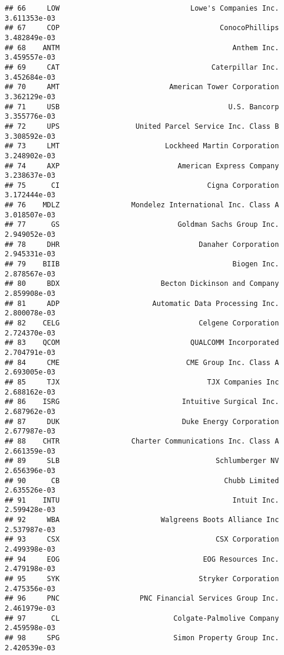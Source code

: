 \documentclass[
]{article}
\begin{document}
\begin{verbatim}
## 66     LOW                               Lowe's Companies Inc. 3.611353e-03
## 67     COP                                      ConocoPhillips 3.482849e-03
## 68    ANTM                                         Anthem Inc. 3.459557e-03
## 69     CAT                                    Caterpillar Inc. 3.452684e-03
## 70     AMT                          American Tower Corporation 3.362129e-03
## 71     USB                                        U.S. Bancorp 3.355776e-03
## 72     UPS                  United Parcel Service Inc. Class B 3.308592e-03
## 73     LMT                         Lockheed Martin Corporation 3.248902e-03
## 74     AXP                            American Express Company 3.238637e-03
## 75      CI                                   Cigna Corporation 3.172444e-03
## 76    MDLZ                 Mondelez International Inc. Class A 3.018507e-03
## 77      GS                            Goldman Sachs Group Inc. 2.949052e-03
## 78     DHR                                 Danaher Corporation 2.945331e-03
## 79    BIIB                                         Biogen Inc. 2.878567e-03
## 80     BDX                        Becton Dickinson and Company 2.859908e-03
## 81     ADP                      Automatic Data Processing Inc. 2.800078e-03
## 82    CELG                                 Celgene Corporation 2.724370e-03
## 83    QCOM                               QUALCOMM Incorporated 2.704791e-03
## 84     CME                              CME Group Inc. Class A 2.693005e-03
## 85     TJX                                   TJX Companies Inc 2.688162e-03
## 86    ISRG                             Intuitive Surgical Inc. 2.687962e-03
## 87     DUK                             Duke Energy Corporation 2.677987e-03
## 88    CHTR                 Charter Communications Inc. Class A 2.661359e-03
## 89     SLB                                     Schlumberger NV 2.656396e-03
## 90      CB                                       Chubb Limited 2.635526e-03
## 91    INTU                                         Intuit Inc. 2.599428e-03
## 92     WBA                        Walgreens Boots Alliance Inc 2.537987e-03
## 93     CSX                                     CSX Corporation 2.499398e-03
## 94     EOG                                  EOG Resources Inc. 2.479198e-03
## 95     SYK                                 Stryker Corporation 2.475356e-03
## 96     PNC                   PNC Financial Services Group Inc. 2.461979e-03
## 97      CL                           Colgate-Palmolive Company 2.459598e-03
## 98     SPG                           Simon Property Group Inc. 2.420539e-03

\end{verbatim}
\end{document}
